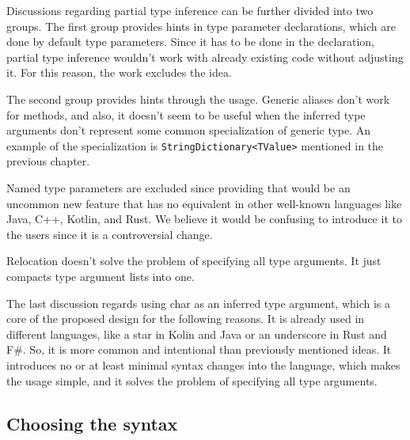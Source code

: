 Discussions regarding partial type inference can be further divided into two groups. 
The first group provides hints in type parameter declarations, which are done by default type parameters. 
Since it has to be done in the declaration, partial type inference wouldn’t work with already existing code without adjusting it.
For this reason, the work excludes the idea.
\par
The second group provides hints through the usage. 
Generic aliases
don’t work for methods, and also, it doesn’t seem to be useful when the inferred type arguments don’t represent some common specialization of generic type.  
An example of the specialization is \texttt{StringDictionary<TValue>} mentioned in the previous chapter.
\par
Named type parameters are excluded since providing that would be an uncommon new feature that has no equivalent in other well-known languages like Java, C++, Kotlin, and Rust. 
We believe it would be confusing to introduce it to the users since it is a controversial change.
\par
Relocation doesn’t solve the problem of specifying all type arguments. 
It just compacts type argument lists into one.
\par
The last discussion regards using char as an inferred type argument, which is a core of the proposed design for the following reasons. 
It is already used in different languages, like a star in Kolin and Java or an underscore in Rust and F\#. 
So, it is more common and intentional than previously mentioned ideas. 
It introduces no or at least minimal syntax changes into the language, which makes the usage simple, and it solves the problem of specifying all type arguments.

\subsection{Choosing the syntax}

